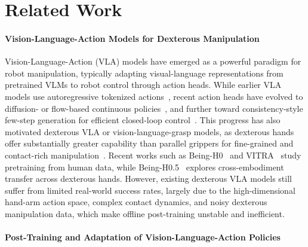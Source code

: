 \documentclass{article}
\begin{document}
\section{Related Work}

\paragraph{Vision-Language-Action Models for Dexterous Manipulation}Vision-Language-Action (VLA) models have emerged as a powerful paradigm for robot manipulation, typically adapting visual-language representations from pretrained VLMs to robot control through action heads. While earlier VLA models use autoregressive tokenized actions~\cite{zitkovich2023rt, mees2024octo, kim2024openvla}, recent action heads have evolved to diffusion- or flow-based continuous policies~\cite{li2025scalable, chen2025flowing}, and further toward consistency-style few-step generation for efficient closed-loop control~\cite{black2024pi_0,intelligence2025pi_}. This progress has also motivated dexterous VLA or vision-language-grasp models, as dexterous hands offer substantially greater capability than parallel grippers for fine-grained and contact-rich manipulation~\cite{luo2026being,zhong2025dexgraspvla,he2025dexvlg}. Recent works such as Being-H0~\cite{luo2025being} and VITRA~\cite{li2025scalable} study pretraining from human data, while Being-H0.5~\cite{luo2026being} explores cross-embodiment transfer across dexterous hands. However, existing dexterous VLA models still suffer from limited real-world success rates, largely due to the high-dimensional hand-arm action space, complex contact dynamics, and noisy dexterous manipulation data, which make offline post-training unstable and inefficient.

\paragraph{Post-Training and Adaptation of Vision-Language-Action Policies}
\end{document}
